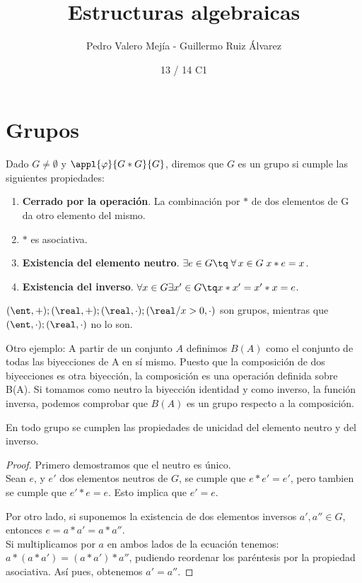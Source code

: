 \documentclass[nochap]{apuntes}
\title{Estructuras algebraicas}
\author{Pedro Valero Mejía - Guillermo Ruiz Álvarez}
\date{13 / 14 C1}
\begin{document}
\pagestyle{plain}
\maketitle
\tableofcontents
\newpage

\section{Grupos}

\begin{defn}[Grupo]
Dado $G\neq \emptyset$  y $\appl{\varphi}{G\ast G}{G}$, diremos que $G$ es un grupo si cumple las siguientes propiedades:
\begin{enumerate}
\item \textbf{Cerrado por la operación}. La combinación por $\ast$  de dos elementos de G da otro elemento del mismo. 
\item $\ast$ es asociativa.
\item \textbf{Existencia del elemento neutro}. $\exists  e \in G \tq \; \forall\, x\in G\; x\ast e=x$.
\item \textbf{Existencia del inverso}. $\forall x \in G \exists x' \in G \tq x\ast x'=x'\ast x=e$.
\end{enumerate}
\end{defn}

\begin{example}
  $ (\ent, +); (\real, +); (\real, \cdot); (\real/x>0, \cdot)$ son grupos, mientras que 
  $(\ent, \cdot); (\real, \cdot)$ no lo son.
  
  Otro ejemplo: A partir de un conjunto $A$ definimos $B(A)$ como el conjunto de todas las biyecciones de A en sí mismo.  Puesto que la composición de dos biyecciones es otra biyección, la composición es una operación definida sobre B(A). Si tomamos como neutro la biyección identidad y como inverso, la función inversa, podemos comprobar que $B(A)$ es un grupo respecto a la composición.
\end{example}

\begin{theorem}
  En todo grupo se cumplen las propiedades de unicidad del elemento neutro y del inverso.
\end{theorem}

\begin{proof}
Primero demostramos que el neutro es único. \\
Sean $e$, y $e'$ dos elementos neutros de $G$, se cumple que $e\ast e'=e'$, pero tambien se cumple que $e'\ast e=e$. Esto implica que $e'=e$.

Por otro lado, si suponemos la existencia de dos elementos inversos $a',a''\in G$, entonces $e=a\ast a'=a\ast a''$. \\
Si multiplicamos por $a$ en ambos lados de la ecuación tenemos: $a\ast (a\ast a')=(a\ast a')\ast a''$, pudiendo reordenar los paréntesis por la 
propiedad asociativa. Así pues, obtenemos $a'=a''$.
\end{proof}
\end{document}
